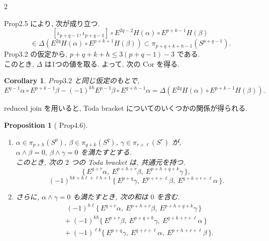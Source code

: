 \documentclass[10pt, leqno]{ltjsarticle}
\newcommand{\toda}[1]{\{\,#1\,\}}              %
\numberwithin{equation}{section}
\theoremstyle{plain}
\newtheorem{proposition}[theorem]{Proposition}
\newtheorem{corollary}[theorem]{Corollary}
\theoremstyle{definition}
\theoremstyle{remark}
\begin{document}
\begin{paracol}{2}

Prop2.5 により, 次が成り立つ. 
\[
[\iota_{p+q-1}, \iota_{p+q-1}]\circ E^{2q-2}H(\alpha)\circ E^{p+k-1}H(\beta)
\]
\[
\in \Delta(E^{2q}H(\alpha)\circ E^{p+k+1}H(\beta))
\subset\pi_{p+q+k+h-1}(S^{p+q-1}).
\]
Prop3.2 の仮定から, \(p+q+k+h\le 3(p+q-1)-3\) である. \\
このとき, \(\Delta\) は1つの値を取る. よって, 次の Cor を得る. 

\begin{corollary}\label{cor:3.3}
Prop$3.2$ と同じ仮定のもとで,
\[
E^{q-1}\alpha\circ E^{p+k-1}\beta
 - (-1)^{kh} E^{p-1}\beta\circ E^{q+h-1}\alpha
 = \Delta(E^{2q}H(\alpha)\circ E^{p+k-1}H(\beta)).
\]
\end{corollary}

reduced join を用いると, Toda bracket についてのいくつかの関係が得られる. 

\begin{proposition}[\cite{Toda1959} Prop4.6]\label{prop:3.4}
\begin{enumerate}
\item[\textup{i)}]
$\alpha\in\pi_{p+h}(S^p)$, 
$\beta\in\pi_{q+k}(S^q)$, 
$\gamma\in\pi_{r+\ell}(S^r)$ が,\\
\(\alpha \wedge \beta = 0,\ \beta \wedge \gamma = 0\)
を満たすとする. \\
このとき, 次の $2$ つの Toda bracket は, 共通元を持つ.
\[
\toda{E^{q+r}\alpha,\ E^{p+h+r}\beta,\ E^{p+h+q+k}\gamma}, 
\]
\[
(-1)^{hk+k\ell+\ell h+1}\,\toda{E^{p+q}\gamma,\ E^{p+r+\ell}\beta,\ 
E^{q+k+r+\ell}\alpha}.
\]
\item[\textup{ii)}]
さらに, $\alpha \wedge \gamma=0$ も満たすとき, 次の和は \(0\) を含む. 
\[
\begin{aligned}
&\ (-1)^{h\ell} \toda{E^{q+r}\alpha,\ E^{p+h+r}\beta,\ E^{p+h+q+k}\gamma}\\
&+\;(-1)^{kh}\toda{E^{p+r}\beta,\ E^{p+q+k}\gamma,\ E^{q+k+r+\ell}\alpha}\\
&+\;(-1)^{\ell k}\toda{E^{p+q}\gamma,\ E^{q+r+\ell}\alpha,\ E^{p+h+r+\ell}\beta} .
\end{aligned}
\]
\end{enumerate}
\end{proposition}


\end{paracol}
\end{document}
